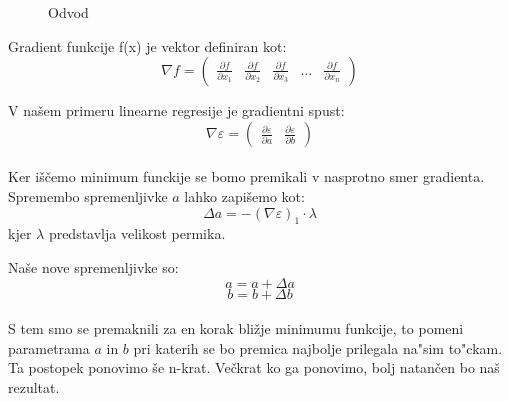 \documentclass[a4paper, 12pt]{article}
\begin{document}
	
	\begin{figure}[!h]
		\centering
		\caption{Odvod}
	\end{figure}
	
	Gradient funkcije f(x) je vektor definiran kot:
	$$\nabla f = \begin{pmatrix}\frac{\partial f}{\partial x_{1}} & \frac{\partial f}{\partial x_{2}} & \frac{\partial f}{\partial x_{3}} & ... & \frac{\partial f}{\partial x_{n}}\end{pmatrix}$$
	
	V našem primeru linearne regresije je gradientni spust:
	$$\nabla \varepsilon =
	\begin{pmatrix}
	\frac{\partial \varepsilon}{\partial a} &
	\frac{\partial \varepsilon}{\partial b} 
	\end{pmatrix}$$
	
	\paragraph{}
	Ker iščemo minimum funckije se bomo premikali v nasprotno smer gradienta. Spremembo spremenljivke $a$ lahko zapišemo kot:
	$$\Delta a = -(\nabla \varepsilon)_1 \cdot \lambda$$
	kjer $\lambda$ predstavlja velikost permika.
	
	Naše nove spremenljivke so:
	$$ a = a + \Delta a$$
	$$ b = b + \Delta b$$
	
	\paragraph{}
	S tem smo se premaknili za en korak bližje minimumu funkcije, to pomeni parametrama $a$ in $b$ pri katerih se bo premica najbolje prilegala na"sim to"ckam. Ta postopek ponovimo še n-krat. Večkrat ko ga ponovimo, bolj natančen bo naš rezultat.
	
\end{document}
